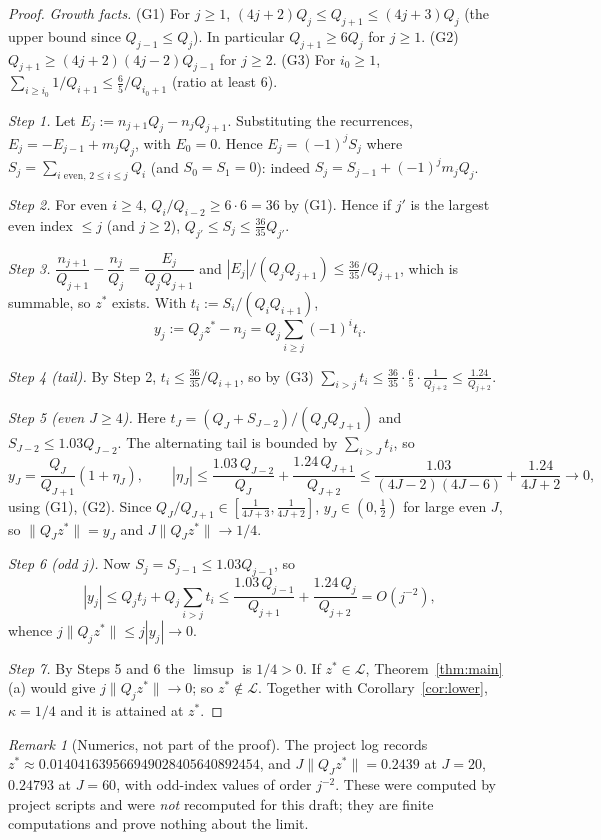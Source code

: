 \documentclass[11pt]{amsart}
\theoremstyle{remark}
\newtheorem{remark}[theorem]{Remark}
\newcommand{\dist}[1]{\lVert #1\rVert}
\newcommand{\LL}{\mathcal{L}}
\begin{document}
\begin{proof}
\emph{Growth facts.} (G1) For $j\ge1$, $(4j+2)Q_j\le Q_{j+1}\le(4j+3)Q_j$ (the upper bound since
$Q_{j-1}\le Q_j$). In particular $Q_{j+1}\ge6Q_j$ for $j\ge1$. (G2) $Q_{j+1}\ge(4j+2)(4j-2)Q_{j-1}$ for
$j\ge2$. (G3) For $i_0\ge1$, $\sum_{i\ge i_0}1/Q_{i+1}\le\frac65/Q_{i_0+1}$ (ratio at least $6$).

\emph{Step 1.} Let $E_j:=n_{j+1}Q_j-n_jQ_{j+1}$. Substituting the recurrences,
$E_j=-E_{j-1}+m_jQ_j$, with $E_0=0$. Hence $E_j=(-1)^jS_j$ where
$S_j=\sum_{i\text{ even},\,2\le i\le j}Q_i$ (and $S_0=S_1=0$): indeed $S_j=S_{j-1}+(-1)^jm_jQ_j$.

\emph{Step 2.} For even $i\ge4$, $Q_i/Q_{i-2}\ge6\cdot6=36$ by (G1). Hence if $j'$ is the largest even index
$\le j$ (and $j\ge2$), $Q_{j'}\le S_j\le\frac{36}{35}Q_{j'}$.

\emph{Step 3.} $\dfrac{n_{j+1}}{Q_{j+1}}-\dfrac{n_j}{Q_j}=\dfrac{E_j}{Q_jQ_{j+1}}$ and
$|E_j|/(Q_jQ_{j+1})\le\frac{36}{35}/Q_{j+1}$, which is summable, so $z^*$ exists. With
$t_i:=S_i/(Q_iQ_{i+1})$,
\[
y_j:=Q_jz^*-n_j=Q_j\sum_{i\ge j}(-1)^it_i .
\]

\emph{Step 4 (tail).} By Step 2, $t_i\le\frac{36}{35}/Q_{i+1}$, so by (G3)
$\sum_{i>j}t_i\le\frac{36}{35}\cdot\frac65\cdot\frac1{Q_{j+2}}\le\frac{1.24}{Q_{j+2}}$.

\emph{Step 5 (even $J\ge4$).} Here $t_J=(Q_J+S_{J-2})/(Q_JQ_{J+1})$ and $S_{J-2}\le1.03Q_{J-2}$.
The alternating tail is bounded by $\sum_{i>J}t_i$, so
\[
y_J=\frac{Q_J}{Q_{J+1}}(1+\eta_J),\qquad
|\eta_J|\le\frac{1.03\,Q_{J-2}}{Q_J}+\frac{1.24\,Q_{J+1}}{Q_{J+2}}
\le\frac{1.03}{(4J-2)(4J-6)}+\frac{1.24}{4J+2}\longrightarrow0,
\]
using (G1), (G2). Since $Q_J/Q_{J+1}\in[\frac1{4J+3},\frac1{4J+2}]$, $y_J\in(0,\tfrac12)$ for large even $J$,
so $\dist{Q_Jz^*}=y_J$ and $J\dist{Q_Jz^*}\to1/4$.

\emph{Step 6 (odd $j$).} Now $S_j=S_{j-1}\le1.03Q_{j-1}$, so
\[
|y_j|\le Q_jt_j+Q_j\sum_{i>j}t_i\le\frac{1.03\,Q_{j-1}}{Q_{j+1}}+\frac{1.24\,Q_j}{Q_{j+2}}=O(j^{-2}),
\]
whence $j\dist{Q_jz^*}\le j|y_j|\to0$.

\emph{Step 7.} By Steps 5 and 6 the $\limsup$ is $1/4>0$. If $z^*\in\LL$, Theorem~\ref{thm:main}(a)
would give $j\dist{Q_jz^*}\to0$; so $z^*\notin\LL$. Together with Corollary~\ref{cor:lower}, $\kappa=1/4$ and
it is attained at $z^*$. \qedhere
\end{proof}

\begin{remark}[Numerics, not part of the proof]
The project log records $z^*\approx0.0140416395\allowbreak 6694902840\allowbreak 5640892454$, and
$J\dist{Q_Jz^*}=0.2439$ at $J=20$, $0.24793$ at $J=60$, with odd-index values of
order $j^{-2}$. These were computed by project scripts and were \emph{not} recomputed for this draft;
they are finite computations and prove nothing about the limit.
\end{remark}
\end{document}
